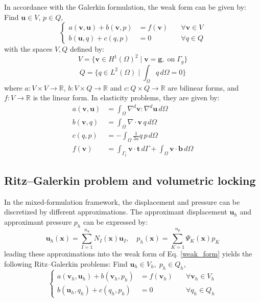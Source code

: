 In accordance with the Galerkin formulation, the weak form can be given by:
Find $\boldsymbol{u} \in V$, $p \in Q$,
\begin{equation}\label{weak_form}
\left\{
\begin{aligned}
a(\boldsymbol{v}, \boldsymbol{u}) + b(\boldsymbol{v}, p) &= f(\boldsymbol{v}) \quad &\forall \boldsymbol{v} \in V \\
b(\boldsymbol{u}, q) + c(q, p) &= 0 \quad &\forall q \in Q
\end{aligned}
\right.
\end{equation}
with the spaces $V, Q$ defined by:
\begin{equation}\label{mix_formulation}
V = \{\boldsymbol{v} \in H^1(\Omega)^2 \mid \boldsymbol{v} = \boldsymbol{g}, \; \textrm{on} \; \Gamma_g\}
\end{equation}
\begin{equation}
Q = \{q \in L^2(\Omega) \mid \int_{\Omega} q \, d\Omega = 0\}
\end{equation}
where $a: V \times V \rightarrow \mathbb{R}$, $b: V \times Q \rightarrow \mathbb{R}$ and $c: Q \times Q \rightarrow \mathbb{R}$ are bilinear forms, and $f: V \rightarrow \mathbb{R}$ is the linear form. In elasticity problems, they are given by:
\begin{align}
a(\boldsymbol{v}, \boldsymbol{u}) &= \int_\Omega \nabla^d \boldsymbol{v} : \nabla^d \boldsymbol{u} \, d\Omega \\
b(\boldsymbol{v}, q) &= \int_\Omega \nabla \cdot \boldsymbol{v} \, q \, d\Omega \\
\label{form_c}
c(q, p) &= -\int_\Omega \frac{1}{3\kappa} q \, p \, d\Omega \\
f(\boldsymbol{v}) &= \int_{\Gamma_t} \boldsymbol{v} \cdot \boldsymbol{t} \, d\Gamma + \int_{\Omega} \boldsymbol{v} \cdot \boldsymbol{b} \, d\Omega
\end{align}

\subsection{Ritz--Galerkin problem and volumetric locking}
In the mixed-formulation framework, the displacement and pressure can be discretized by different approximations. The approximant displacement $\boldsymbol{u}_h$ and approximant pressure $p_h$ can be expressed by:
\begin{equation}
\boldsymbol{u}_h(\boldsymbol{x}) = \sum_{I = 1}^{n_u} N_I(\boldsymbol{x}) \boldsymbol{u}_I, \quad
p_h(\boldsymbol{x}) = \sum_{K = 1}^{n_p} \Psi_K(\boldsymbol{x}) p_K
\end{equation}
leading these approximations into the weak form of Eq. \eqref{weak_form} yields the following Ritz--Galerkin problems:
Find $\boldsymbol{u}_h \in V_h, \; p_h \in Q_h$,
\begin{equation}\label{ritz_Galerkin}
\left\{
\begin{aligned}
a(\boldsymbol{v}_h, \boldsymbol{u}_h) + b(\boldsymbol{v}_h, p_h) &= f(\boldsymbol{v}_h) \quad &\forall \boldsymbol{v}_h \in V_h \\
b(\boldsymbol{u}_h, q_h) + c(q_h, p_h) &= 0 \quad &\forall q_h \in Q_h
\end{aligned}
\right.
\end{equation}

